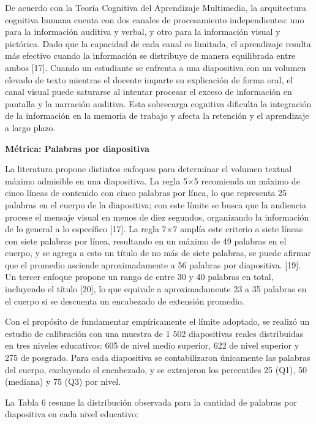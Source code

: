 \documentclass[11pt]{article}
\begin{document}
De acuerdo con la Teoría Cognitiva del Aprendizaje Multimedia, la arquitectura cognitiva humana cuenta con dos canales de procesamiento independientes: uno para la información auditiva y verbal, y otro para la información visual y pictórica. Dado que la capacidad de cada canal es limitada, el aprendizaje resulta más efectivo cuando la información se distribuye de manera equilibrada entre ambos [17]. Cuando un estudiante se enfrenta a una diapositiva con un volumen elevado de texto mientras el docente imparte su explicación de forma oral, el canal visual puede saturarse al intentar procesar el exceso de información en pantalla y la narración auditiva. Esta sobrecarga cognitiva dificulta la integración de la información en la memoria de trabajo y afecta la retención y el aprendizaje a largo plazo.

\textbf{Métrica: Palabras por diapositiva}

La literatura propone distintos enfoques para determinar el volumen textual máximo admisible en una diapositiva. La regla 5×5 recomienda un máximo de cinco líneas de contenido con cinco palabras por línea, lo que representa 25 palabras en el cuerpo de la diapositiva; con este límite se busca que la audiencia procese el mensaje visual en menos de diez segundos, organizando la información de lo general a lo específico [17]. La regla 7×7 amplía este criterio a siete líneas con siete palabras por línea, resultando en un máximo de 49 palabras en el cuerpo, y se agrega a esto un título de no más de siete palabras, se puede afirmar que el promedio asciende aproximadamente a 56 palabras por diapositiva. [19]. Un tercer enfoque propone un rango de entre 30 y 40 palabras en total, incluyendo el título [20], lo que equivale a aproximadamente 23 a 35 palabras en el cuerpo si se descuenta un encabezado de extensión promedio.



Con el propósito de fundamentar empíricamente el límite adoptado, se realizó un estudio de calibración con una muestra de 1 502 diapositivas reales distribuidas en tres niveles educativos: 605 de nivel medio superior, 622 de nivel superior y 275 de posgrado. Para cada diapositiva se contabilizaron únicamente las palabras del cuerpo, excluyendo el encabezado, y se extrajeron los percentiles 25 (Q1), 50 (mediana) y 75 (Q3) por nivel. 

La Tabla 6 resume la distribución observada para la cantidad de palabras por diapositiva en cada nivel educativo:
\end{document}
